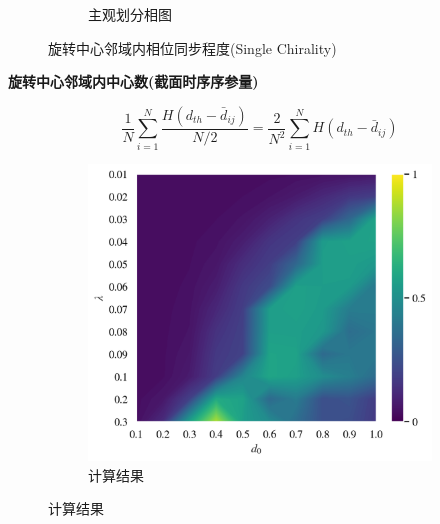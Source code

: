 \documentclass{article}
\begin{document}
\begin{figure}[H]
\begin{subfigure}[b]{0.49\textwidth}
		\vspace{-1cm}
		\caption{主观划分相图}
	\end{subfigure}
	\vspace{-0.5cm}
	\caption{旋转中心邻域内相位同步程度(Single Chirality)}
	\label{fig:fig234c.5.2}
\end{figure}


\noindent\textbf{旋转中心邻域内中心数(截面时序序参量)}

$$
\frac{1}{N}\sum_{i=1}^N{\frac{H\left( d_{th}-\bar{d}_{ij} \right)}{N/2}}=\frac{2}{N^2}\sum_{i=1}^N{H\left( d_{th}-\bar{d}_{ij} \right)}
$$

\vspace{-0.5cm}
\begin{figure}[H]
	\centering
	\begin{subfigure}[b]{0.49\textwidth}
		\includegraphics[width=\textwidth]{./figs/nearbyNumsRing.png}
		\vspace{-1cm}
		\caption{计算结果}
		

\end{subfigure}
\end{figure}
\end{document}
